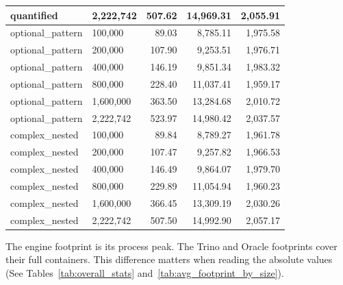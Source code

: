 {\begin{longtable}{>{\ttfamily}llrrr}
quantified & 2{,}222{,}742 & 507.62 & 14{,}969.31 & 2{,}055.91 \\
\midrule
optional\_pattern & 100{,}000 & 89.03 & 8{,}785.11 & 1{,}975.58 \\
optional\_pattern & 200{,}000 & 107.90 & 9{,}253.51 & 1{,}976.71 \\
optional\_pattern & 400{,}000 & 146.19 & 9{,}851.34 & 1{,}983.32 \\
optional\_pattern & 800{,}000 & 228.40 & 11{,}037.41 & 1{,}959.17 \\
optional\_pattern & 1{,}600{,}000 & 363.50 & 13{,}284.68 & 2{,}010.72 \\
optional\_pattern & 2{,}222{,}742 & 523.97 & 14{,}980.42 & 2{,}037.57 \\
\midrule
complex\_nested & 100{,}000 & 89.84 & 8{,}789.27 & 1{,}961.78 \\
complex\_nested & 200{,}000 & 107.47 & 9{,}257.82 & 1{,}966.53 \\
complex\_nested & 400{,}000 & 146.49 & 9{,}864.07 & 1{,}979.70 \\
complex\_nested & 800{,}000 & 229.89 & 11{,}054.94 & 1{,}960.23 \\
complex\_nested & 1{,}600{,}000 & 366.45 & 13{,}309.19 & 2{,}030.26 \\
complex\_nested & 2{,}222{,}742 & 507.50 & 14{,}992.90 & 2{,}057.17 \\
\end{longtable}
}

The engine footprint is its process peak.  The Trino and Oracle
footprints cover their full containers.  This difference matters when
reading the absolute values (See Tables~\ref{tab:overall_stats}
and~\ref{tab:avg_footprint_by_size}).

\begin{table}[H]
\centering
\caption{Overall benchmark statistics by system}
\label{tab:overall_stats}
\end{table}

